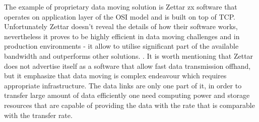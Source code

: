 \documentclass[magisterska,en]{pracamgr}
\begin{document}
The example of proprietary data moving solution is Zettar zx software that operates on application layer of the OSI model and is built on top of TCP. Unfortunately Zettar doesn't reveal the details of how their software works, nevertheless it proves to be highly efficient in data moving challenges \cite{DMC_SC_Asia} and in production environments - it allow to utilise significant part of the available bandwidth and outperforms other solutions. \cite{zettar_product_brief}. It is worth mentioning that Zettar does not advertise itself as a software that allow fast data transmission offhand, but it emphasize that data moving is complex endeavour which requires appropriate infrastructure. The data links are only one part of it, in order to transfer large amount of data efficiently one need computing power and storage resources that are capable of providing the data with the rate that is comparable with the transfer rate. \cite{zettar_white_paper}
\end{document}
